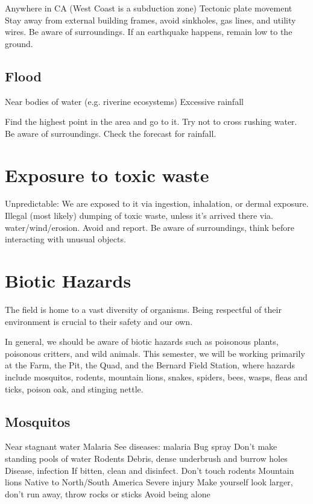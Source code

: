 \documentclass[12pt]{../SOP2}
\begin{document}
\NP Anywhere in CA (West Coast is a subduction zone)
Tectonic plate movement
Stay away from external building frames, avoid sinkholes, gas lines, and utility wires.
Be aware of surroundings. If an earthquake happens, remain low to the ground.


\subsection{Flood}

Near bodies of water (e.g. riverine ecosystems)
Excessive rainfall

\NP Find the highest point in the area and go to it. Try not to cross rushing water. Be aware of surroundings. Check the forecast for rainfall.

\section{Exposure to toxic waste}
Unpredictable: We are exposed to it via ingestion, inhalation, or dermal exposure.
Illegal (most likely) dumping of toxic waste, unless it’s arrived there via. water/wind/erosion.
Avoid and report.
Be aware of surroundings, think before interacting with unusual objects.

\section{Biotic Hazards}

\NP The field is home to a vast diversity of organisms. Being respectful of their environment is crucial to their safety and our own.

\NP In general, we should be aware of biotic hazards such as poisonous plants, poisonous critters, and wild animals. This semester, we will be working primarily at the Farm, the Pit, the Quad, and the Bernard Field Station, where hazards include mosquitos, rodents, mountain lions, snakes, spiders, bees, wasps, fleas and ticks, poison oak, and stinging nettle.

\subsection{Mosquitos}

Near stagnant water
Malaria
See diseases: malaria
Bug spray
Don’t make standing pools of water
Rodents
Debris, dense underbrush and burrow holes
Disease, infection
If bitten, clean and disinfect.
Don’t touch rodents
Mountain lions
Native to North/South America
Severe injury
Make yourself look larger, don’t run away, throw rocks or sticks
Avoid being alone 
\end{document}
